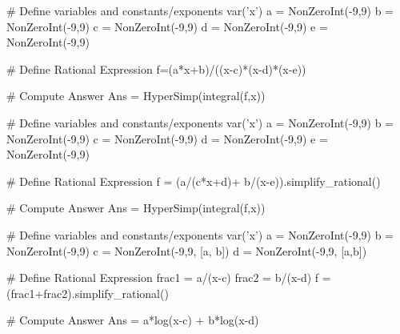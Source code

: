 \begin{sagesilent}
# Define variables and constants/exponents
var('x')
a = NonZeroInt(-9,9)
b = NonZeroInt(-9,9)
c = NonZeroInt(-9,9)
d = NonZeroInt(-9,9)
e = NonZeroInt(-9,9)


# Define Rational Expression
f=(a*x+b)/((x-c)*(x-d)*(x-e))

# Compute Answer
Ans = HyperSimp(integral(f,x))
\end{sagesilent}


\begin{sagesilent}
# Define variables and constants/exponents
var('x')
a = NonZeroInt(-9,9)
b = NonZeroInt(-9,9)
c = NonZeroInt(-9,9)
d = NonZeroInt(-9,9)
e = NonZeroInt(-9,9)


# Define Rational Expression
f = (a/(c*x+d)+ b/(x-e)).simplify_rational()

# Compute Answer
Ans = HyperSimp(integral(f,x))
\end{sagesilent}




\begin{sagesilent}
# Define variables and constants/exponents
var('x')
a = NonZeroInt(-9,9)
b = NonZeroInt(-9,9)
c = NonZeroInt(-9,9, [a, b])
d = NonZeroInt(-9,9, [a,b])


# Define Rational Expression
frac1 = a/(x-c)
frac2 = b/(x-d)
f = (frac1+frac2).simplify_rational()

# Compute Answer
Ans = a*log(x-c) + b*log(x-d)
\end{sagesilent}

